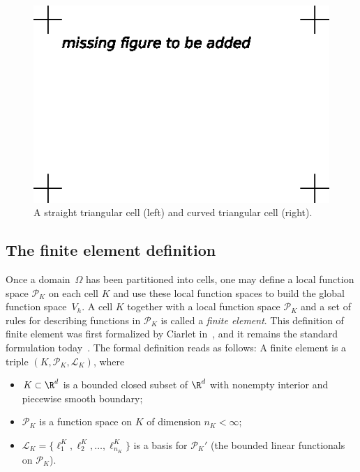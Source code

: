 \begin{figure}
  \begin{center}
    \includegraphics[width=\largewidth]{chapters/kirby-7/eps/missing-figure.eps}
    \caption{A straight triangular cell (left) and curved triangular
      cell (right).}
    \label{fig:shapes,curved}
  \end{center}
\end{figure}

\subsection{The finite element definition}

Once a domain~$\Omega$ has been partitioned into cells, one may define
a local function space $\mathcal{P}_K$ on each cell $K$ and use these
local function spaces to build the global function space~$V_h$. A cell
$K$ together with a local function space $\mathcal{P}_K$ and a set of
rules for describing functions in $\mathcal{P}_K$ is called a
\emph{finite element}. This definition of finite element was first
formalized by Ciarlet in~\citet{Ciarlet1978,Ciarlet2002}, and it
remains the standard formulation
today~\cite{BrennerScott1994,BrennerScott2008}. The formal definition
reads as follows: A finite element is a triple $(K, \mathcal{P}_K,
\mathcal{L}_K)$, where
\begin{itemize}
\item
  $K \subset \R^d$ is a bounded closed subset of $\R^d$ with nonempty
  interior and piecewise smooth boundary;
\item
  $\mathcal{P}_K$ is a function space on $K$ of dimension $n_K < \infty$;
\item
  $\mathcal{L}_K = \{\ell^K_1, \ell^K_2, \ldots, \ell^K_{n_K}\}$ is a
  basis for $\mathcal{P}_K'$ (the bounded linear functionals on
  $\mathcal{P}_K$).
\end{itemize}

